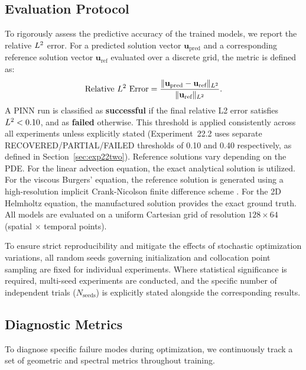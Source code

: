 \subsection{Evaluation Protocol}

To rigorously assess the predictive accuracy of the trained models, we report the relative $L^2$ error. For a predicted solution vector $\mathbf{u}_{\text{pred}}$ and a corresponding reference solution vector $\mathbf{u}_{\text{ref}}$ evaluated over a discrete grid, the metric is defined as:
\begin{equation}
    \text{Relative } L^2 \text{ Error} = \frac{\|\mathbf{u}_{\text{pred}} - \mathbf{u}_{\text{ref}}\|_{L^2}}{\|\mathbf{u}_{\text{ref}}\|_{L^2}}.
\end{equation}
A PINN run is classified as \textbf{successful} if the final relative L2 error satisfies $L^2{} < 0.10$, and as \textbf{failed} otherwise. This threshold is applied consistently across all experiments unless explicitly stated (Experiment~22.2 uses separate RECOVERED/PARTIAL/FAILED thresholds of 0.10 and 0.40 respectively, as defined in Section~\ref{sec:exp22two}).
Reference solutions vary depending on the PDE. For the linear advection equation, the exact analytical solution is utilized. For the viscous Burgers' equation, the reference solution is generated using a high-resolution implicit Crank-Nicolson finite difference scheme \cite{Crank1947}. For the 2D Helmholtz equation, the manufactured solution provides the exact ground truth. All models are evaluated on a uniform Cartesian grid of resolution $128 \times 64$ (spatial $\times$ temporal points). 

To ensure strict reproducibility and mitigate the effects of stochastic optimization variations, all random seeds governing initialization and collocation point sampling are fixed for individual experiments. Where statistical significance is required, multi-seed experiments are conducted, and the specific number of independent trials ($N_{\text{seeds}}$) is explicitly stated alongside the corresponding results.

\subsection{Diagnostic Metrics}

To diagnose specific failure modes during optimization, we continuously track a set of geometric and spectral metrics throughout training. 

